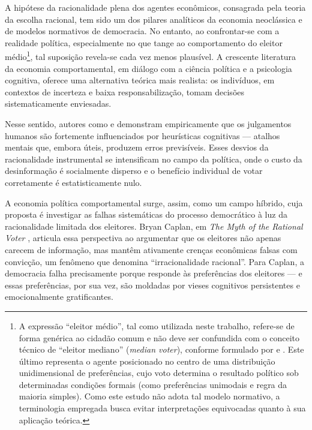 A hipótese da racionalidade plena dos agentes econômicos, consagrada pela teoria da escolha racional, tem sido um dos pilares analíticos da economia neoclássica e de modelos normativos de democracia. No entanto, ao confrontar-se com a realidade política, especialmente no que tange ao comportamento do eleitor médio\footnote{A expressão “eleitor médio”, tal como utilizada neste trabalho, refere-se de forma genérica ao cidadão comum e não deve ser confundida com o conceito técnico de “eleitor mediano” (\textit{median voter}), conforme formulado por  e . Este último representa o agente posicionado no centro de uma distribuição unidimensional de preferências, cujo voto determina o resultado político sob determinadas condições formais (como preferências unimodais e regra da maioria simples). Como este estudo não adota tal modelo normativo, a terminologia empregada busca evitar interpretações equivocadas quanto à sua aplicação teórica.}, tal suposição revela-se cada vez menos plausível. A crescente literatura da economia comportamental, em diálogo com a ciência política e a psicologia cognitiva, oferece uma alternativa teórica mais realista: os indivíduos, em contextos de incerteza e baixa responsabilização, tomam decisões sistematicamente enviesadas.

Nesse sentido, autores como  e  demonstram empiricamente que os julgamentos humanos são fortemente influenciados por heurísticas cognitivas — atalhos mentais que, embora úteis, produzem erros previsíveis. Esses desvios da racionalidade instrumental se intensificam no campo da política, onde o custo da desinformação é socialmente disperso e o benefício individual de votar corretamente é estatisticamente nulo.

A economia política comportamental surge, assim, como um campo híbrido, cuja proposta é investigar as falhas sistemáticas do processo democrático à luz da racionalidade limitada dos eleitores. Bryan Caplan, em \textit{The Myth of the Rational Voter} \citeyear{The_Myth_of_the_Rational_Voter}, articula essa perspectiva ao argumentar que os eleitores não apenas carecem de informação, mas mantêm ativamente crenças econômicas falsas com convicção, um fenômeno que denomina ``irracionalidade racional''. Para Caplan, a democracia falha precisamente porque responde às preferências dos eleitores — e essas preferências, por sua vez, são moldadas por vieses cognitivos persistentes e emocionalmente gratificantes.

